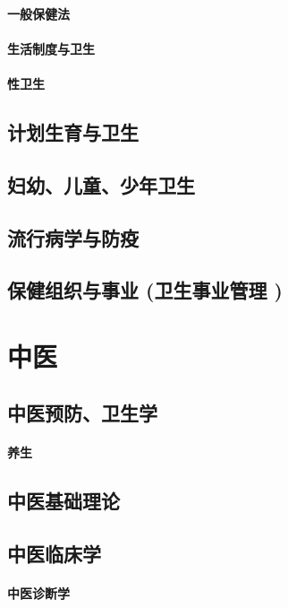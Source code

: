 \documentclass[UTF8]{../ApplicationUniverse}
\begin{document}
    \subsubsection{一般保健法}
    \subsubsection{生活制度与卫生}
    \subsubsection{性卫生}
\section{计划生育与卫生}
\section{妇幼、儿童、少年卫生}
\section{流行病学与防疫}
\section{保健组织与事业 (卫生事业管理 )}







\chapter{中医}
\section{中医预防、卫生学}
    \subsubsection{养生}
\section{中医基础理论}
\section{中医临床学}
    \subsubsection{中医诊断学}
\end{document}
